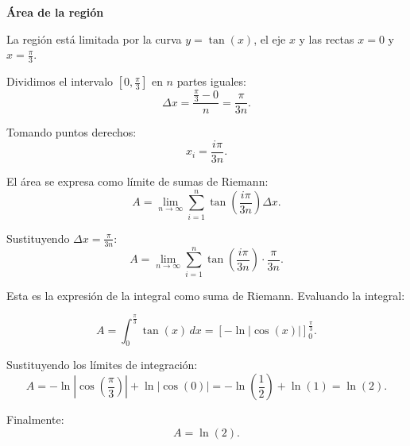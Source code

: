 \textbf{Área de la región}
\nopagebreak

La región está limitada por la curva \(y = \tan(x)\), el eje \(x\) y las rectas
\(x = 0\) y \(x = \frac{\pi}{3}\).  

Dividimos el intervalo \([0, \frac{\pi}{3}]\) en \(n\) partes iguales:
\[
\Delta x = \frac{\frac{\pi}{3} - 0}{n} = \frac{\pi}{3n}.
\]

Tomando puntos derechos:
\[
x_i = \frac{i \pi}{3n}.
\]

El área se expresa como límite de sumas de Riemann:
\[
A = \lim_{n \to \infty} \sum_{i=1}^{n} \tan\left(\frac{i \pi}{3n}\right) \Delta x.
\]

Sustituyendo \(\Delta x = \frac{\pi}{3n}\):
\[
A = \lim_{n \to \infty} \sum_{i=1}^{n} \tan\left(\frac{i \pi}{3n}\right) \cdot \frac{\pi}{3n}.
\]

Esta es la expresión de la integral como suma de Riemann. Evaluando la integral:

\[
A = \int_0^{\frac{\pi}{3}} \tan(x) \, dx
= \left[-\ln|\cos(x)|\right]_0^{\frac{\pi}{3}}.
\]

Sustituyendo los límites de integración:
\[
A = -\ln|\cos(\frac{\pi}{3})| + \ln|\cos(0)|
= -\ln\left(\frac{1}{2}\right) + \ln(1)
= \ln(2).
\]

Finalmente:
\[
\boxed{A = \ln(2)}.
\]
